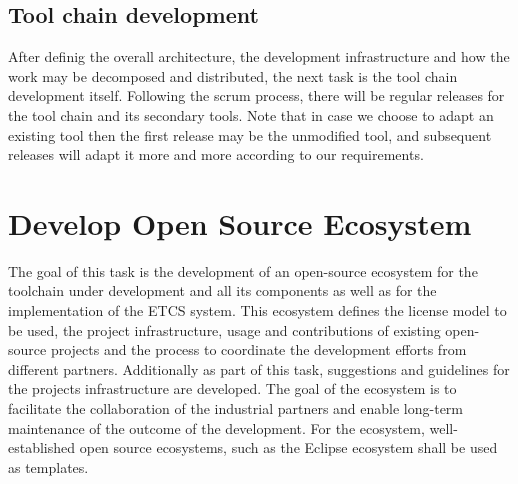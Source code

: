 \documentclass{template/openetcs_article}
\begin{document}
\subsection{Tool chain development}
After definig the overall architecture, the development infrastructure and how
the work may be decomposed and distributed, the next task is the tool chain
development itself. Following the scrum process, there will be regular releases
for the tool chain and its secondary tools. Note that in case we choose to
adapt an existing tool then the first release may be  the unmodified tool,
and subsequent releases will adapt it more and more according to our requirements. 




\section{Develop Open Source Ecosystem}
The goal of this task is the development of an open-source ecosystem for the toolchain under development and all its components as well as for the implementation of the ETCS system. This ecosystem defines the license model to be used, the project infrastructure, usage and contributions of existing open-source projects and the process to coordinate the development efforts from different partners. Additionally as part of this task, suggestions and guidelines for the projects infrastructure are developed. The goal of the ecosystem is to facilitate the collaboration of the industrial partners and enable long-term maintenance of the outcome of the development. For the ecosystem, well-established open source ecosystems, such as the Eclipse ecosystem shall be used as templates.
\end{document}
